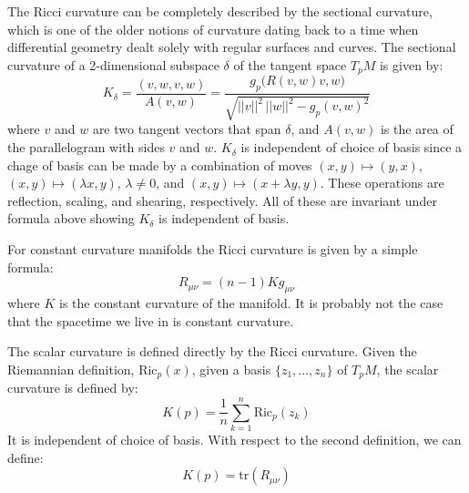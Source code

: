 \documentclass{beamer}
\begin{document}
    \begin{frame}
        The Ricci curvature can be completely described by the sectional
        curvature, which is one of the older notions of curvature dating back
        to a time when differential geometry dealt solely with regular surfaces
        and curves. The sectional curvature of a 2-dimensional subspace
        $\delta$ of the tangent space $T_{p}M$ is given by:
        \begin{equation}
            K_{\delta}=\frac{(v,w,v,w)}{A(v,w)}
                =\frac{g_{p}\big(R(v,w)v,w\big)}{\sqrt{||v||^{2}\,||w||^{2}-g_{p}(v,w)^{2}}}
        \end{equation}
        where $v$ and $w$ are two tangent vectors that span $\delta$, and
        $A(v,w)$ is the area of the parallelogram with sides $v$ and $w$.
        $K_{\delta}$ is independent of choice of basis since a chage of basis
        can be made by a combination of moves
        $(x,y)\mapsto(y,x)$, $(x,y)\mapsto(\lambda{x},y)$, $\lambda\ne{0}$, and
        $(x,y)\mapsto(x+\lambda{y},y)$. These operations are reflection,
        scaling, and shearing, respectively. All of these are invariant under
        formula above showing $K_{\delta}$ is independent of basis.
    \end{frame}
    \begin{frame}
        For constant curvature manifolds the Ricci curvature is given by a
        simple formula:
        \begin{equation}
            R_{\mu\nu}=(n-1)Kg_{\mu\nu}
        \end{equation}
        where $K$ is the constant curvature of the manifold.
        It is probably not the case that the spacetime we live in is constant
        curvature.
    \end{frame}
    \begin{frame}
        The scalar curvature is defined directly by the Ricci curvature. Given
        the Riemannian definition, $\textrm{Ric}_{p}(x)$, given a basis
        $\{z_{1},\dots,z_{n}\}$ of $T_{p}M$, the scalar curvature is defined by:
        \begin{equation}
            K(p)=\frac{1}{n}\sum_{k=1}^{n}\textrm{Ric}_{p}(z_{k})
        \end{equation}
        It is independent of choice of basis. With respect to the second
        definition, we can define:
        \begin{equation}
            K(p)=\textrm{tr}(R_{\mu\nu})
        \end{equation}
    \end{frame}
\end{document}
